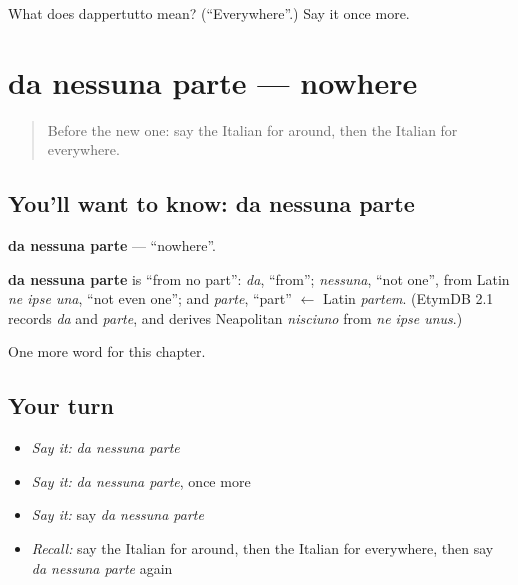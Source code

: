 \begin{tcolorbox}[breakable,colback=teal!4,colframe=teal!35!black,title={Before you move on}]
What does dappertutto mean? (\textquotedblleft{}Everywhere\textquotedblright{}.) Say it once more.
\end{tcolorbox}
\section[da nessuna parte]{da nessuna parte — nowhere}

\label{lesson:IT-C154-da-nessuna-parte}



\begin{quote}
Before the new one: say the Italian for around, then the Italian for everywhere.
\end{quote}

\subsection*{You'll want to know: da nessuna parte}
\textbf{da nessuna parte} — \textquotedblleft{}nowhere\textquotedblright{}.

\begin{cousinweb}
\textbf{da nessuna parte} is \textquotedblleft{}from no part\textquotedblright{}: \emph{da}, \textquotedblleft{}from\textquotedblright{}; \emph{nessuna}, \textquotedblleft{}not one\textquotedblright{}, from Latin \emph{ne ipse una}, \textquotedblleft{}not even one\textquotedblright{}; and \emph{parte}, \textquotedblleft{}part\textquotedblright{} $\leftarrow$ Latin \emph{partem}. (EtymDB 2.1 records \emph{da} and \emph{parte}, and derives Neapolitan \emph{nisciuno} from \emph{ne ipse unus}.)
\end{cousinweb}

\begin{grammarlens}[title={What you've built}]
One more word for this chapter.
\end{grammarlens}

\subsection*{Your turn}
\begin{itemize}
\raggedright
  \item \emph{Say it:} \emph{da nessuna parte}
  \item \emph{Say it:} \emph{da nessuna parte}, once more
  \item \emph{Say it:} say \emph{da nessuna parte}
  \item \emph{Recall:} say the Italian for around, then the Italian for everywhere, then say \emph{da nessuna parte} again
\end{itemize}

